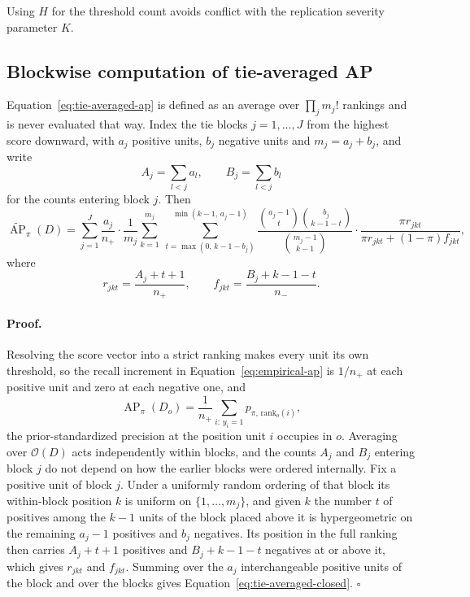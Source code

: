 \documentclass[11pt]{article}
\newcommand{\AP}{\operatorname{AP}}
\newcommand{\APta}{\widetilde{\AP}}
\theoremstyle{remark}
\begin{document}
Using $H$ for the threshold count avoids conflict with the replication severity parameter $K$.

\subsection{Blockwise computation of tie-averaged AP}
\label{app:tie-computation}

Equation~\eqref{eq:tie-averaged-ap} is defined as an average over $\prod_j m_j!$ rankings and is never evaluated that way. Index the tie blocks $j=1,\ldots,J$ from the highest score downward, with $a_j$ positive units, $b_j$ negative units and $m_j=a_j+b_j$, and write
\[
A_j=\sum_{l<j}a_l,
\qquad
B_j=\sum_{l<j}b_l
\]
for the counts entering block $j$. Then
\begin{equation}
\APta_\pi(D)
=
\sum_{j=1}^{J}
\frac{a_j}{n_+}
\cdot
\frac{1}{m_j}
\sum_{k=1}^{m_j}
\ \sum_{t=\max(0,\,k-1-b_j)}^{\min(k-1,\,a_j-1)}
\frac{\binom{a_j-1}{t}\binom{b_j}{k-1-t}}{\binom{m_j-1}{k-1}}
\cdot
\frac{\pi r_{jkt}}
{\pi r_{jkt}+(1-\pi)f_{jkt}},
\label{eq:tie-averaged-closed}
\end{equation}
where
\[
r_{jkt}=\frac{A_j+t+1}{n_+},
\qquad
f_{jkt}=\frac{B_j+k-1-t}{n_-}.
\]

\paragraph{Proof.}
Resolving the score vector into a strict ranking makes every unit its own threshold, so the recall increment in Equation~\eqref{eq:empirical-ap} is $1/n_+$ at each positive unit and zero at each negative one, and
\[
\AP_\pi(D_o)
=
\frac{1}{n_+}
\sum_{i:\,y_i=1}
p_{\pi,\,\mathrm{rank}_o(i)} ,
\]
the prior-standardized precision at the position unit $i$ occupies in $o$. Averaging over $\mathcal{O}(D)$ acts independently within blocks, and the counts $A_j$ and $B_j$ entering block $j$ do not depend on how the earlier blocks were ordered internally. Fix a positive unit of block $j$. Under a uniformly random ordering of that block its within-block position $k$ is uniform on $\{1,\ldots,m_j\}$, and given $k$ the number $t$ of positives among the $k-1$ units of the block placed above it is hypergeometric on the remaining $a_j-1$ positives and $b_j$ negatives. Its position in the full ranking then carries $A_j+t+1$ positives and $B_j+k-1-t$ negatives at or above it, which gives $r_{jkt}$ and $f_{jkt}$. Summing over the $a_j$ interchangeable positive units of the block and over the blocks gives Equation~\eqref{eq:tie-averaged-closed}. $\square$
\end{document}
